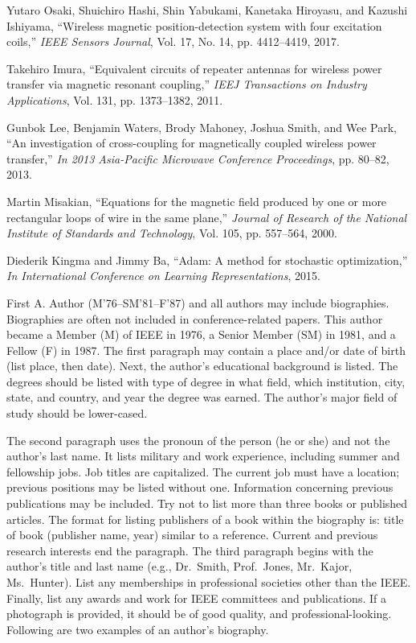 \documentclass[journal,twoside,web]{ieeecolor}
\begin{document}
\begin{thebibliography}{00}
 Yutaro Osaki, Shuichiro Hashi, Shin Yabukami, Kanetaka Hiroyasu, and Kazushi Ishiyama, ``Wireless magnetic position-detection
system with four excitation coils,'' \emph{IEEE Sensors Journal}, Vol. 17,
No. 14, pp. 4412–4419, 2017.

 Takehiro Imura, ``Equivalent circuits of repeater antennas for wireless power transfer via magnetic resonant coupling,'' \emph{IEEJ Transactions on Industry Applications}, Vol. 131, pp. 1373–1382, 2011.

 Gunbok Lee, Benjamin Waters, Brody Mahoney, Joshua Smith,
and Wee Park, ``An investigation of cross-coupling for magnetically
coupled wireless power transfer,'' \emph{ In 2013 Asia-Pacific Microwave
Conference Proceedings},  pp. 80–82, 2013.

 Martin Misakian, ``Equations for the magnetic field produced by
one or more rectangular loops of wire in the same plane,'' \emph{Journal
of Research of the National Institute of Standards and Technology},  Vol. 105, pp. 557–564, 2000.

 Diederik Kingma and Jimmy Ba, ``Adam: A method for stochastic
optimization,'' \emph{ In International Conference on Learning Representations}, 2015.


\end{thebibliography}

\begin{IEEEbiography}{First A. Author} (M'76--SM'81--F'87) and all authors may include 
biographies. Biographies are often not included in conference-related
papers. This author became a Member (M) of IEEE in 1976, a Senior
Member (SM) in 1981, and a Fellow (F) in 1987. The first paragraph may
contain a place and/or date of birth (list place, then date). Next,
the author's educational background is listed. The degrees should be
listed with type of degree in what field, which institution, city,
state, and country, and year the degree was earned. The author's major
field of study should be lower-cased. 

The second paragraph uses the pronoun of the person (he or she) and not the 
author's last name. It lists military and work experience, including summer 
and fellowship jobs. Job titles are capitalized. The current job must have a 
location; previous positions may be listed 
without one. Information concerning previous publications may be included. 
Try not to list more than three books or published articles. The format for 
listing publishers of a book within the biography is: title of book 
(publisher name, year) similar to a reference. Current and previous research 
interests end the paragraph. The third paragraph begins with the author's 
title and last name (e.g., Dr.\ Smith, Prof.\ Jones, Mr.\ Kajor, Ms.\ Hunter). 
List any memberships in professional societies other than the IEEE. Finally, 
list any awards and work for IEEE committees and publications. If a 
photograph is provided, it should be of good quality, and 
professional-looking. Following are two examples of an author's biography.
\end{IEEEbiography}
\end{document}
